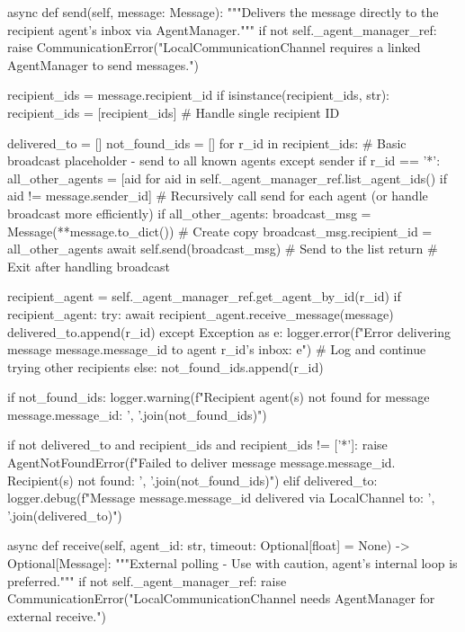 \documentclass{amsbook}
\theoremstyle{definition}
\theoremstyle{remark}
\numberwithin{equation}{chapter} %
\begin{document}
\begin{python}
    async def send(self, message: Message):
        """Delivers the message directly to the recipient agent's inbox via AgentManager."""
        if not self._agent_manager_ref:
             raise CommunicationError("LocalCommunicationChannel requires a linked AgentManager to send messages.")

        recipient_ids = message.recipient_id
        if isinstance(recipient_ids, str):
            recipient_ids = [recipient_ids] # Handle single recipient ID

        delivered_to = []
        not_found_ids = []
        for r_id in recipient_ids:
            # Basic broadcast placeholder - send to all known agents except sender
            if r_id == '*':
                 all_other_agents = [aid for aid in self._agent_manager_ref.list_agent_ids() if aid != message.sender_id]
                 # Recursively call send for each agent (or handle broadcast more efficiently)
                 if all_other_agents:
                     broadcast_msg = Message(**message.to_dict()) # Create copy
                     broadcast_msg.recipient_id = all_other_agents
                     await self.send(broadcast_msg) # Send to the list
                 return # Exit after handling broadcast

            recipient_agent = self._agent_manager_ref.get_agent_by_id(r_id)
            if recipient_agent:
                try:
                    await recipient_agent.receive_message(message)
                    delivered_to.append(r_id)
                except Exception as e:
                     logger.error(f"Error delivering message {message.message_id} to agent {r_id}'s inbox: {e}")
                     # Log and continue trying other recipients
            else:
                not_found_ids.append(r_id)

        if not_found_ids:
            logger.warning(f"Recipient agent(s) not found for message {message.message_id}: {', '.join(not_found_ids)}")

        if not delivered_to and recipient_ids and recipient_ids != ['*']:
             raise AgentNotFoundError(f"Failed to deliver message {message.message_id}. Recipient(s) not found: {', '.join(not_found_ids)}")
        elif delivered_to:
             logger.debug(f"Message {message.message_id} delivered via LocalChannel to: {', '.join(delivered_to)}")


    async def receive(self, agent_id: str, timeout: Optional[float] = None) -> Optional[Message]:
        """External polling - Use with caution, agent's internal loop is preferred."""
        if not self._agent_manager_ref:
             raise CommunicationError("LocalCommunicationChannel needs AgentManager for external receive.")


\end{python}
\end{document}
